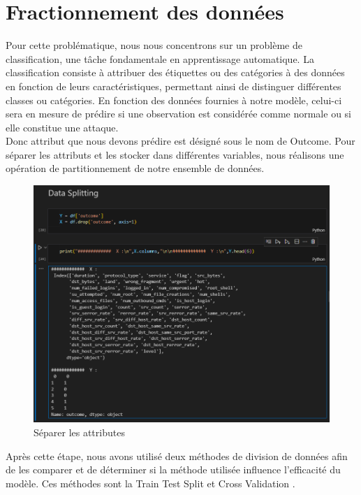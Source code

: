 \documentclass[a4paper,12pt]{report}
\begin{document}
\section{Fractionnement des données}
\noindent \normalsize Pour cette problématique, nous nous concentrons sur un problème de classification, une tâche fondamentale en apprentissage automatique. La classification consiste à attribuer des étiquettes ou des catégories à des données en fonction de leurs caractéristiques, permettant ainsi de distinguer différentes classes ou catégories. En fonction des données fournies à notre modèle, celui-ci sera en mesure de prédire si une observation est considérée comme normale ou si elle constitue une attaque.\\[0.2cm]
\noindent \normalsize Donc attribut que nous devons prédire est désigné sous le nom de \textcolor{colortxt}{Outcome}. Pour séparer les attributs et les stocker dans différentes variables, nous réalisons une opération de partitionnement de notre ensemble de données.
\begin{figure}[H]
\centering
 \includegraphics[scale=0.7]{outils-images/data7.png}
\caption{Séparer les attributes}
\end{figure} 
\noindent \normalsize Après cette étape, nous avons utilisé deux méthodes de division de données afin de les comparer et de déterminer si la méthode utilisée influence l'efficacité du modèle. Ces méthodes sont la 
\textcolor{colortxt}{Train Test Split} et \textcolor{colortxt}{Cross Validation} .
\end{document}
